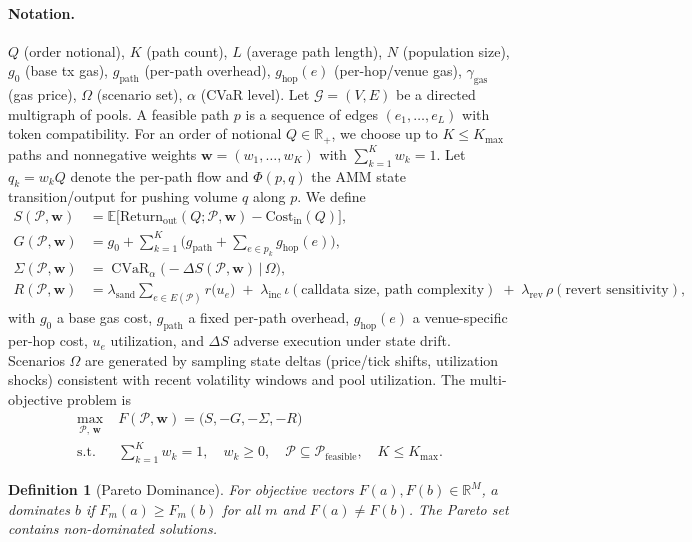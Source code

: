\documentclass[11pt]{article}
\newtheorem{definition}{Definition}
\DeclareMathOperator{\CVaR}{CVaR}
\newcommand{\R}{\mathbb{R}}
\newcommand{\E}{\mathbb{E}}
\newcommand{\1}{\mathbf{1}}  %
\begin{document}
\paragraph{Notation.} $Q$ (order notional), $K$ (path count), $L$ (average path length), $N$ (population size), $g_0$ (base tx gas), $g_{\text{path}}$ (per-path overhead), $g_{\text{hop}}(e)$ (per-hop/venue gas), $\gamma_{\text{gas}}$ (gas price), $\Omega$ (scenario set), $\alpha$ (CVaR level).
Let $\mathcal{G}=(V,E)$ be a directed multigraph of pools. A feasible path $p$ is a sequence of edges $(e_1,\dots,e_L)$ with token compatibility. For an order of notional $Q\in\R_{+}$, we choose up to $K\le K_{\max}$ paths and nonnegative weights $\mathbf{w}=(w_1,\dots,w_K)$ with $\sum_{k=1}^{K} w_k = 1$. Let $q_k = w_k Q$ denote the per-path flow and $\Phi(p, q)$ the AMM state transition/output for pushing volume $q$ along $p$.
We define
\begin{align}
S(\mathcal{P},\mathbf{w}) &= \E\big[\text{Return}_{\text{out}}(Q; \mathcal{P},\mathbf{w}) - \text{Cost}_{\text{in}}(Q)\big],\\
G(\mathcal{P},\mathbf{w}) &= g_0 + \sum_{k=1}^{K}\!\Big( g_{\text{path}} + \sum_{e\in p_k} g_{\text{hop}}(e)\Big),\\
\Sigma(\mathcal{P},\mathbf{w}) &= \CVaR_{\alpha}\!\big(-\Delta S(\mathcal{P},\mathbf{w})\,\big|\,\Omega\big),\\
R(\mathcal{P},\mathbf{w}) &= \lambda_{\text{sand}}\!\sum_{e\in E(\mathcal{P})} r\big(u_e\big)\; +\; \lambda_{\text{inc}}\,\iota(\text{calldata size, path complexity})\; +\; \lambda_{\text{rev}}\,\rho(\text{revert sensitivity}),
\end{align}
with $g_0$ a base gas cost, $g_{\text{path}}$ a fixed per-path overhead, $g_{\text{hop}}(e)$ a venue-specific per-hop cost, $u_e$ utilization, and $\Delta S$ adverse execution under state drift. Scenarios $\Omega$ are generated by sampling state deltas (price/tick shifts, utilization shocks) consistent with recent volatility windows and pool utilization. The multi-objective problem is
\begin{align}
\max_{\mathcal{P},\,\mathbf{w}}\; & F(\mathcal{P},\mathbf{w}) = \big(S, -G, -\Sigma, -R\big) \\
\text{s.t.}\;& \sum_{k=1}^{K} w_k = 1,\quad w_k\ge 0,\quad \mathcal{P}\subseteq\mathcal{P}_{\text{feasible}}, \quad K\le K_{\max}.
\end{align}
\begin{definition}[Pareto Dominance]
For objective vectors $F(a),F(b)\in\R^{M}$, $a$ \emph{dominates} $b$ if $F_m(a)\ge F_m(b)$ for all $m$ and $F(a)\ne F(b)$. The Pareto set contains non-dominated solutions.
\end{definition}
\end{document}
